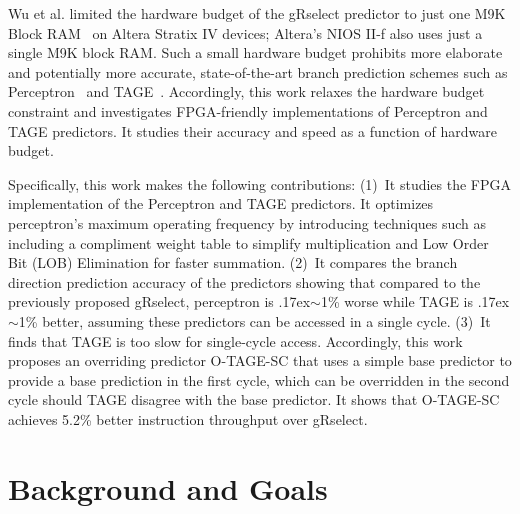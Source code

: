 \documentclass[conference]{IEEEtran}
\newcommand{\mytilde}{{\raise.17ex\hbox{$\scriptstyle\sim$}}}
\begin{document}
Wu et al. limited the hardware budget of the gRselect predictor to just one M9K Block RAM~\cite{StratixIVM9K} on Altera Stratix IV devices; Altera's NIOS II-f also uses just a single M9K block RAM. Such a small hardware budget prohibits more elaborate and potentially more accurate, state-of-the-art branch prediction schemes such as Perceptron~\cite{perceptron} and TAGE~\cite{tage}. Accordingly, this work relaxes the hardware budget constraint and investigates FPGA-friendly implementations of Perceptron and TAGE predictors. It studies their accuracy and speed as a function of hardware budget.  

Specifically, this work makes the following contributions: (1)~It studies the FPGA implementation of the Perceptron and TAGE predictors. It optimizes perceptron's maximum operating frequency by introducing techniques such as including a compliment weight table to simplify multiplication and Low Order Bit (LOB) Elimination for faster summation. (2)~It compares the branch direction prediction accuracy of the predictors showing that compared to the previously proposed gRselect, perceptron is \mytilde 1\% worse while TAGE is \mytilde 1\% better, assuming these predictors can be accessed in a single cycle. (3)~It finds that TAGE is too slow for single-cycle access. Accordingly, this work proposes an overriding predictor \mbox{O-TAGE-SC} that uses a simple base predictor to provide a base prediction in the first cycle, which can be overridden in the second cycle should TAGE disagree with the base predictor. It shows that \mbox{O-TAGE-SC} achieves 5.2\% better instruction throughput over gRselect.

\section{Background and Goals}
\label{sec:background}

\end{document}
